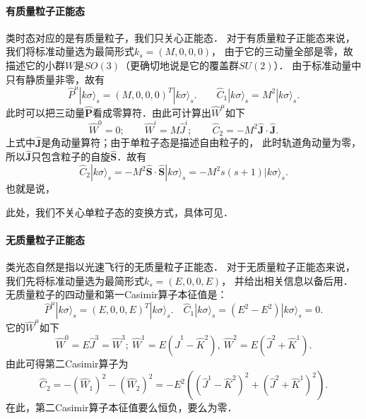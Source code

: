 \paragraph{有质量粒子正能态}
类时态对应的是有质量粒子，我们只关心正能态．
对于有质量粒子正能态来说，我们将标准动量选为最简形式$k_s=(M,0,0,0)$，
由于它的三动量全部是零，故描述它的小群$W$是$SO(3)$（更确切地说是它的覆盖群$SU(2)$）．
由于标准动量中只有静质量非零，故有
\begin{equation}
	\hat{P}^\mu |k\sigma\rangle_s = (M,0,0,0)^T |k\sigma\rangle_s.    \qquad
	\hat{C}_1 |k\sigma\rangle_s = M^2 |k\sigma\rangle_s.
\end{equation}
此时可以把三动量$\hat{\boldsymbol{P}}$看成零算符．由此可计算出$\widehat{W}^\mu$如下
\begin{equation}
	\widehat{W}^0=0;\qquad  \widehat{W}^i =  M {\hat{J}}^i ;\qquad  
	\hat{C}_2=- M^2 \boldsymbol{\hat{J}}\cdot\boldsymbol{\hat{J}}.
\end{equation}
上式中$\boldsymbol{\hat{J}}$是角动量算符；由于单粒子态是描述自由粒子的，
此时轨道角动量为零，所以$\boldsymbol{\hat{J}}$只包含粒子的自旋$\boldsymbol{\hat{S}}$．故有
\begin{equation}
	\hat{C}_2 |k\sigma\rangle_s =-M^2 \boldsymbol{\hat{S}}\cdot\boldsymbol{\hat{S}}
	|k\sigma\rangle_s =- M^2 s(s+1)|k\sigma\rangle_s.
\end{equation}
也就是说，


此处，我们不关心单粒子态的变换方式，具体可见\parencite[\S 2.5]{weinberg_vol1}．


\paragraph{无质量粒子正能态}
类光态自然是指以光速飞行的无质量粒子正能态．
对于无质量粒子正能态来说，我们先将标准动量选为最简形式$k_s=(E,0,0,E)$，
并给出相关信息以备后用．无质量粒子的四动量和第一Casimir算子本征值是：
\begin{equation}
	\hat{P}^\mu |k\sigma\rangle_s = (E,0,0,E)^T |k\sigma\rangle_s.    \quad
	\hat{C}_1 |k\sigma\rangle_s =(E^2-E^2) |k\sigma\rangle_s=0.
\end{equation}
它的$\widehat{W}^\mu$如下
\begin{equation}\label{chlar:eqn_0W}
	\widehat{W}^0 = E \hat{J}^3 = \widehat{W}^3;\
	\widehat{W}^1 = E \left( {\hat{J}}^1 -{\hat{K}}^2 \right), \ 
	\widehat{W}^2 = E \left( {\hat{J}}^2 +{\hat{K}}^1 \right).
\end{equation}
由此可得第二Casimir算子为
\begin{equation}\label{chlar:eqn_C2-massless}
	\hat{C}_2 = -(\widehat{W}_1)^2-(\widehat{W}_2)^2
	=-E^2\left( \left( {\hat{J}}^1- {\hat{K}}^2  \right)^2 + 
	\left( {\hat{J}}^2 +{\hat{K}}^1 \right)^2\right) .
\end{equation}
在此，第二Casimir算子本征值要么恒负，要么为零．





